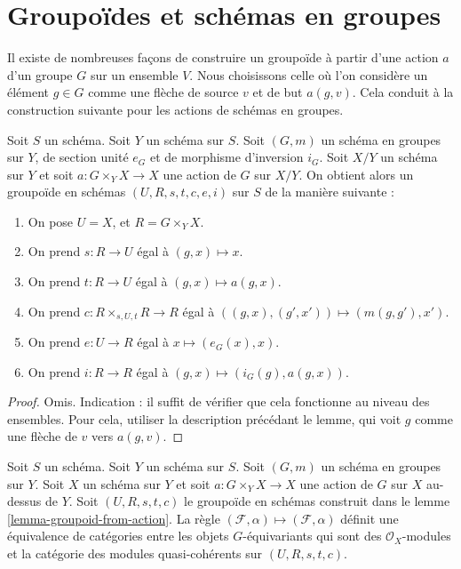 \section{Groupoïdes et schémas en groupes}
\label{section-groupoids-group-schemes}

\noindent
Il existe de nombreuses façons de construire un groupoïde à partir d'une action $a$
d'un groupe $G$ sur un ensemble $V$. Nous choisissons celle où l'on considère
un élément $g \in G$ comme une flèche de source $v$ et de but $a(g, v)$.
Cela conduit à la construction suivante pour les actions de schémas en
groupes.

\begin{lemma}
\label{lemma-groupoid-from-action}
Soit $S$ un schéma.
Soit $Y$ un schéma sur $S$.
Soit $(G, m)$ un schéma en groupes sur $Y$, de
section unité $e_G$ et de morphisme d'inversion $i_G$.
Soit $X/Y$ un schéma sur $Y$ et soit $a : G \times_Y X \to X$
une action de $G$ sur $X/Y$.
On obtient alors un groupoïde en schémas $(U, R, s, t, c, e, i)$ sur $S$
de la manière suivante :
\begin{enumerate}
\item On pose $U = X$, et $R = G \times_Y X$.
\item On prend $s : R \to U$ égal à $(g, x) \mapsto x$.
\item On prend $t : R \to U$ égal à $(g, x) \mapsto a(g, x)$.
\item On prend $c : R \times_{s, U, t} R \to R$ égal à
$((g, x), (g', x')) \mapsto (m(g, g'), x')$.
\item On prend $e : U \to R$ égal à $x \mapsto (e_G(x), x)$.
\item On prend $i : R \to R$ égal à $(g, x) \mapsto (i_G(g), a(g, x))$.
\end{enumerate}
\end{lemma}

\begin{proof}
Omis. Indication : il suffit de vérifier que cela fonctionne au niveau
des ensembles. Pour cela, utiliser la description précédant le lemme, qui voit
$g$ comme une flèche de $v$ vers $a(g, v)$.
\end{proof}

\begin{lemma}
\label{lemma-action-groupoid-modules}
Soit $S$ un schéma.
Soit $Y$ un schéma sur $S$.
Soit $(G, m)$ un schéma en groupes sur $Y$.
Soit $X$ un schéma sur $Y$ et soit $a : G \times_Y X \to X$
une action de $G$ sur $X$ au-dessus de $Y$. Soit $(U, R, s, t, c)$
le groupoïde en schémas construit dans le lemme \ref{lemma-groupoid-from-action}.
La règle
$(\mathcal{F}, \alpha) \mapsto (\mathcal{F}, \alpha)$ définit
une équivalence de catégories entre les objets $G$-équivariants qui sont des
$\mathcal{O}_X$-modules et la catégorie des modules quasi-cohérents
sur $(U, R, s, t, c)$.
\end{lemma}

